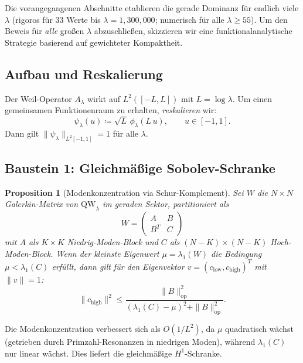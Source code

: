 \documentclass[12pt,a4paper]{article}
\newtheorem{proposition}[theorem]{Proposition}
\theoremstyle{definition}
\theoremstyle{remark}
\begin{document}
Die vorangegangenen Abschnitte etablieren die gerade Dominanz für endlich viele $\lambda$ (rigoros für $33$ Werte bis $\lambda = 1{,}300{,}000$; numerisch für alle $\lambda \geq 55$). Um den Beweis für \emph{alle} großen $\lambda$ abzuschließen, skizzieren wir eine funktionalanalytische Strategie basierend auf gewichteter Kompaktheit.

\subsection{Aufbau und Reskalierung}

Der Weil-Operator $A_\lambda$ wirkt auf $L^2([-L, L])$ mit $L = \log\lambda$. Um einen gemeinsamen Funktionenraum zu erhalten, \emph{reskalieren} wir:
\begin{equation}
\label{eq:rescaled}
\psi_\lambda(u) \coloneqq \sqrt{L}\,\phi_\lambda(L\,u), \qquad u \in [-1,1].
\end{equation}
Dann gilt $\|\psi_\lambda\|_{L^2[-1,1]} = 1$ für alle $\lambda$.

\subsection{Baustein 1: Gleichmäßige Sobolev-Schranke}

\begin{proposition}[Modenkonzentration via Schur-Komplement]
\label{prop:mode-concentration}
Sei $W$ die $N \times N$ Galerkin-Matrix von $\mathrm{QW}_\lambda$ im geraden Sektor, partitioniert als
\[
  W = \begin{pmatrix} A & B \\ B^T & C \end{pmatrix}
\]
mit $A$ als $K \times K$ Niedrig-Moden-Block und $C$ als $(N-K) \times (N-K)$ Hoch-Moden-Block. Wenn der kleinste Eigenwert $\mu = \lambda_1(W)$ die Bedingung $\mu < \lambda_1(C)$ erfüllt, dann gilt für den Eigenvektor $v = (c_{\mathrm{low}}, c_{\mathrm{high}})^T$ mit $\|v\| = 1$:
\begin{equation}
\label{eq:schur-bound}
  \|c_{\mathrm{high}}\|^2 \leq \frac{\|B\|_{\mathrm{op}}^2}{(\lambda_1(C) - \mu)^2 + \|B\|_{\mathrm{op}}^2}.
\end{equation}
\end{proposition}

Die Modenkonzentration verbessert sich als $O(1/L^2)$, da $\mu$ quadratisch wächst (getrieben durch Primzahl-Resonanzen in niedrigen Moden), während $\lambda_1(C)$ nur linear wächst. Dies liefert die gleichmäßige $H^1$-Schranke.
\end{document}
